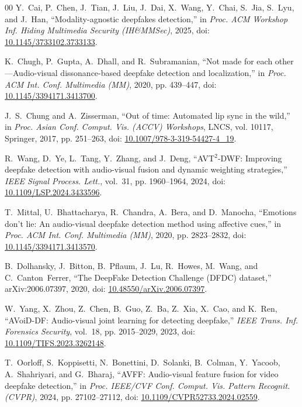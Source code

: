 \documentclass[conference]{IEEEtran}
\begin{document}
\begin{thebibliography}{00}
Y.~Cai, P.~Chen, J.~Tian, J.~Liu, J.~Dai, X.~Wang, Y.~Chai, S.~Jia, S.~Lyu, and J.~Han, ``Modality-agnostic deepfakes detection,'' in \emph{Proc. ACM Workshop Inf. Hiding Multimedia Security (IH\&MMSec)}, 2025, doi: \href{https://doi.org/10.1145/3733102.3733133}{10.1145/3733102.3733133}.

K.~Chugh, P.~Gupta, A.~Dhall, and R.~Subramanian, ``Not made for each other---Audio-visual dissonance-based deepfake detection and localization,'' in \emph{Proc. ACM Int. Conf. Multimedia (MM)}, 2020, pp. 439--447, doi: \href{https://doi.org/10.1145/3394171.3413700}{10.1145/3394171.3413700}.

J.~S.~Chung and A.~Zisserman, ``Out of time: Automated lip sync in the wild,'' in \emph{Proc. Asian Conf. Comput. Vis. (ACCV) Workshops}, LNCS, vol. 10117, Springer, 2017, pp. 251--263, doi: \href{https://doi.org/10.1007/978-3-319-54427-4_19}{10.1007/978-3-319-54427-4\_19}.

R.~Wang, D.~Ye, L.~Tang, Y.~Zhang, and J.~Deng, ``AVT$^{2}$-DWF: Improving deepfake detection with audio-visual fusion and dynamic weighting strategies,'' \emph{IEEE Signal Process. Lett.}, vol.~31, pp. 1960--1964, 2024, doi: \href{https://doi.org/10.1109/LSP.2024.3433596}{10.1109/LSP.2024.3433596}.

T.~Mittal, U.~Bhattacharya, R.~Chandra, A.~Bera, and D.~Manocha, ``Emotions don't lie: An audio-visual deepfake detection method using affective cues,'' in \emph{Proc. ACM Int. Conf. Multimedia (MM)}, 2020, pp. 2823--2832, doi: \href{https://doi.org/10.1145/3394171.3413570}{10.1145/3394171.3413570}.

B.~Dolhansky, J.~Bitton, B.~Pflaum, J.~Lu, R.~Howes, M.~Wang, and C.~Canton~Ferrer, ``The DeepFake Detection Challenge (DFDC) dataset,'' arXiv:2006.07397, 2020, doi: \href{https://doi.org/10.48550/arXiv.2006.07397}{10.48550/arXiv.2006.07397}.

W.~Yang, X.~Zhou, Z.~Chen, B.~Guo, Z.~Ba, Z.~Xia, X.~Cao, and K.~Ren, ``AVoiD-DF: Audio-visual joint learning for detecting deepfake,'' \emph{IEEE Trans. Inf. Forensics Security}, vol.~18, pp. 2015--2029, 2023, doi: \href{https://doi.org/10.1109/TIFS.2023.3262148}{10.1109/TIFS.2023.3262148}.

T.~Oorloff, S.~Koppisetti, N.~Bonettini, D.~Solanki, B.~Colman, Y.~Yacoob, A.~Shahriyari, and G.~Bharaj, ``AVFF: Audio-visual feature fusion for video deepfake detection,'' in \emph{Proc. IEEE/CVF Conf. Comput. Vis. Pattern Recognit. (CVPR)}, 2024, pp. 27102--27112, doi: \href{https://doi.org/10.1109/CVPR52733.2024.02559}{10.1109/CVPR52733.2024.02559}.


\end{thebibliography}
\end{document}
